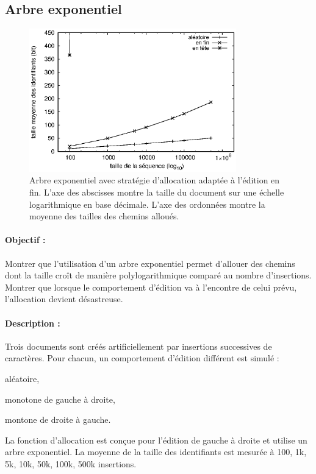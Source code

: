 \subsection{Arbre exponentiel}

\begin{figure}
  \begin{center}
    \includegraphics[width=0.8\textwidth]{img/lseq/double.eps}
    \caption[Influence de l'arbre exponentiel sur la taille des chemins]
    {\label{repl:img:exponentialtree} Arbre exponentiel avec stratégie
      d'allocation adaptée à l'édition en fin. L'axe des abscisses montre la
      taille du document sur une échelle logarithmique en base décimale. L'axe
      des ordonnées montre la moyenne des tailles des chemins alloués.}
  \end{center}
\end{figure}

\paragraph{Objectif :} Montrer que l'utilisation d'un arbre exponentiel permet
d'allouer des chemins dont la taille croît de manière polylogarithmique comparé
au nombre d'insertions. Montrer que lorsque le comportement d'édition va à
l'encontre de celui prévu, l'allocation devient désastreuse.

\paragraph{Description :} Trois documents sont créés artificiellement par
insertions successives de caractères. Pour chacun, un comportement d'édition
différent est simulé :
\begin{inparaenum}[(i)]
\item aléatoire,
\item monotone de gauche à droite,
\item montone de droite à gauche.
\end{inparaenum}
La fonction d'allocation est conçue pour l'édition de gauche à droite et utilise
un arbre exponentiel.  La moyenne de la taille des identifiants est mesurée à
100, 1k, 5k, 10k, 50k, 100k, 500k insertions. 

